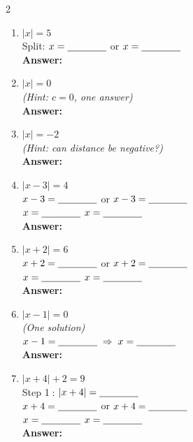 \documentclass[12pt]{article}
\newcommand{\wsp}{\vspace{2.4cm}}
\newcommand{\blank}{\underline{\hspace{2.5cm}}}
\newcommand{\sblank}{\underline{\hspace{1.4cm}}}
\begin{document}
\vspace{8pt}
\begin{multicols}{2}
\begin{enumerate}[label=\textbf{\arabic*.}, itemsep=0pt]

  \item $|x| = 5$\\[3pt]
  Split: $x = \sblank$ \;or\; $x = \sblank$\\[3pt]
  \textbf{Answer:} \blank
  \wsp

  \item $|x| = 0$\\[3pt]
  \textit{(Hint: $c=0$, one answer)}\\[3pt]
  \textbf{Answer:} \blank
  \wsp

  \item $|x| = -2$\\[3pt]
  \textit{(Hint: can distance be negative?)}\\[3pt]
  \textbf{Answer:} \blank
  \wsp

  \item $|x - 3| = 4$\\[3pt]
  $x-3=\sblank$ or $x-3=\sblank$\\[3pt]
  $x=\sblank$ \hspace{1cm} $x=\sblank$\\[3pt]
  \textbf{Answer:} \blank
  \wsp

  \item $|x + 2| = 6$\\[3pt]
  $x+2=\sblank$ or $x+2=\sblank$\\[3pt]
  $x=\sblank$ \hspace{1cm} $x=\sblank$\\[3pt]
  \textbf{Answer:} \blank
  \wsp

  \item $|x - 1| = 0$\\[3pt]
  \textit{(One solution)}\\[3pt]
  $x-1=\sblank \;\Rightarrow\; x=\sblank$\\[3pt]
  \textbf{Answer:} \blank
  \wsp

  \item $|x + 4| + 2 = 9$\\[3pt]
  Step \textcircled{1}: $|x+4|=\sblank$\\[3pt]
  $x+4=\sblank$ or $x+4=\sblank$\\[3pt]
  $x=\sblank$ \hspace{1cm} $x=\sblank$\\[3pt]
  \textbf{Answer:} \blank
  \wsp


\end{enumerate}
\end{multicols}
\end{document}
